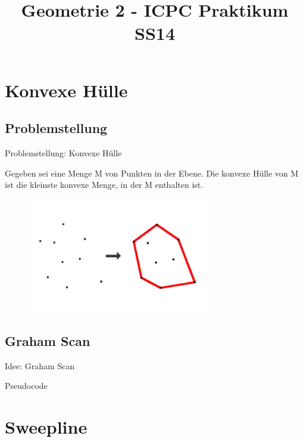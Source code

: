 \documentclass[18pt]{beamer}
\title[Geometrie 2]{Geometrie 2 - ICPC Praktikum SS14}
\institute{Tobias Hornberger $\cdot$ Paul Jungeblut $\cdot$ Enja Stein $\cdot$ Lena Winter}
\begin{document}

\begin{frame}
\titlepage
\end{frame}

\section{Konvexe Hülle}
	\subsection{Problemstellung}
		\begin{frame}{Problemstellung: Konvexe Hülle}
			\begin{box}
			 Gegeben sei eine Menge M von Punkten in der Ebene. Die konvexe Hülle von M ist die kleinste konvexe Menge, in der M enthalten ist.
			\end{box}
			\begin{figure}
				\includegraphics[width=8cm]{logos/konhu.png}\\
			\end{figure}
		\end{frame}
	
	\subsection{Graham Scan}
		\begin{frame}{Idee: Graham Scan}
	
		\end{frame}
	
		\begin{frame}{Pseudocode}
	
		\end{frame}

\section{Sweepline}
\end{document}
